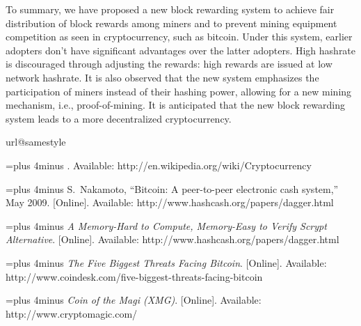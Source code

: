 \documentclass[aps,prl,reprint,showpacs,groupedaddress,letterpaper]{revtex4-1}
\begin{document}
To summary, we have proposed a new block rewarding system to achieve fair distribution of block rewards among miners and to prevent mining equipment competition as seen in cryptocurrency, such as bitcoin. Under this system, earlier adopters don't have significant advantages over the latter adopters. High hashrate is discouraged through adjusting the rewards: high rewards are issued at low network hashrate. It is also observed that the new system emphasizes the participation of miners instead of their hashing power, allowing for a new mining mechanism, i.e., proof-of-mining. It is anticipated that the new block rewarding system leads to a more decentralized cryptocurrency. 





\begin{thebibliography}{5}
\providecommand{\natexlab}[1]{#1}
\providecommand{\url}[1]{#1}
\csname url@samestyle\endcsname
\providecommand{\newblock}{\relax}
\providecommand{\bibinfo}[2]{#2}
\providecommand{\BIBentrySTDinterwordspacing}{\spaceskip=0pt\relax}
\providecommand{\BIBentryALTinterwordstretchfactor}{4}
\providecommand{\BIBentryALTinterwordspacing}{\spaceskip=\fontdimen2\font plus
\BIBentryALTinterwordstretchfactor\fontdimen3\font minus
  \fontdimen4\font\relax}
\providecommand{\BIBforeignlanguage}[2]{{\expandafter\ifx\csname l@#1\endcsname\relax
\typeout{** WARNING: IEEEtranN.bst: No hyphenation pattern has been}\typeout{** loaded for the language `#1'. Using the pattern for}\typeout{** the default language instead.}\else
\language=\csname l@#1\endcsname
\fi
#2}}
\providecommand{\BIBdecl}{\relax}
\BIBdecl

\BIBentryALTinterwordspacing
 [Online]. Available: \url{http://en.wikipedia.org/wiki/Cryptocurrency}
\BIBentrySTDinterwordspacing

\BIBentryALTinterwordspacing
S.~Nakamoto, ``Bitcoin: A peer-to-peer electronic cash system,'' May 2009.
  [Online]. Available: \url{http://www.hashcash.org/papers/dagger.html}
\BIBentrySTDinterwordspacing

\BIBentryALTinterwordspacing
\emph{A Memory-Hard to Compute, Memory-Easy to Verify Scrypt Alternative}.
  [Online]. Available: \url{http://www.hashcash.org/papers/dagger.html}
\BIBentrySTDinterwordspacing

\BIBentryALTinterwordspacing
\emph{The Five Biggest Threats Facing Bitcoin}. [Online]. Available:
  \url{http://www.coindesk.com/five-biggest-threats-facing-bitcoin}
\BIBentrySTDinterwordspacing

\BIBentryALTinterwordspacing
\emph{Coin of the Magi (XMG)}. [Online]. Available:
  \url{http://www.cryptomagic.com/}
\BIBentrySTDinterwordspacing

\end{thebibliography}
\end{document}

